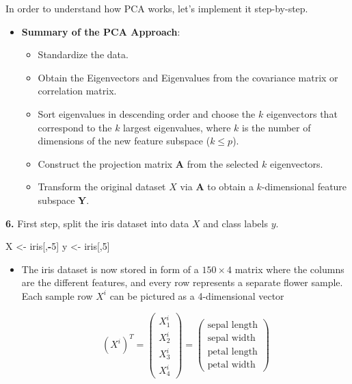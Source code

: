 \documentclass[]{book}
\newenvironment{Shaded}{\begin{snugshade}}{\end{snugshade}}
\newcommand{\DecValTok}[1]{\textcolor[rgb]{0.00,0.00,0.81}{#1}}
\newcommand{\StringTok}[1]{\textcolor[rgb]{0.31,0.60,0.02}{#1}}
\newcommand{\OperatorTok}[1]{\textcolor[rgb]{0.81,0.36,0.00}{\textbf{#1}}}
\newcommand{\NormalTok}[1]{#1}
\providecommand{\tightlist}{%
  \setlength{\itemsep}{0pt}\setlength{\parskip}{0pt}}
\newenvironment{rmdblock}[1]
  {\begin{shaded*}
  \begin{itemize}
  \renewcommand{\labelitemi}{
    \raisebox{-.7\height}[0pt][0pt]{
      {\setkeys{Gin}{width=2em,keepaspectratio}\texttt{[image: img/icons/\#1]}}
    }
  }
  \item
  }
  {
  \end{itemize}
  \end{shaded*}
  }
\newenvironment{rmdinsight}
  {\begin{rmdblock}{insight}}
  {\end{rmdblock}}
\newenvironment{rmdtip}
  {\begin{rmdblock}{tip}}
  {\end{rmdblock}}
\theoremstyle{definition}
\theoremstyle{definition}
\theoremstyle{definition}
\theoremstyle{remark}
\begin{document}
In order to understand how PCA works, let's implement it step-by-step.

\begin{rmdtip}
\textbf{Summary of the PCA Approach}:

\begin{itemize}
\tightlist
\item
  Standardize the data.
\item
  Obtain the Eigenvectors and Eigenvalues from the covariance matrix or
  correlation matrix.
\item
  Sort eigenvalues in descending order and choose the \(k\) eigenvectors
  that correspond to the \(k\) largest eigenvalues, where \(k\) is the
  number of dimensions of the new feature subspace (\(k \le p\)).
\item
  Construct the projection matrix \(\mathbf{A}\) from the selected \(k\)
  eigenvectors.
\item
  Transform the original dataset \(X\) via \(\mathbf{A}\) to obtain a
  \(k\)-dimensional feature subspace \(\mathbf{Y}\).
\end{itemize}
\end{rmdtip}

\textbf{6.} First step, split the iris dataset into data \(X\) and class
labels \(y\).

\begin{Shaded}
\begin{Highlighting}[]
\NormalTok{X <-}\StringTok{ }\NormalTok{iris[,}\OperatorTok{-}\DecValTok{5}\NormalTok{]}
\NormalTok{y <-}\StringTok{ }\NormalTok{iris[,}\DecValTok{5}\NormalTok{]}
\end{Highlighting}
\end{Shaded}

\begin{rmdinsight}
The iris dataset is now stored in form of a \(150 \times 4\) matrix
where the columns are the different features, and every row represents a
separate flower sample. Each sample row \(X^i\) can be pictured as a
4-dimensional vector

\[ (X^i)^T = \begin{pmatrix} X_1^i \\ X_2^i \\ X_3^i \\ X_4^i \end{pmatrix}
= \begin{pmatrix} \text{sepal length} \\ \text{sepal width} \\\text{petal length} \\ \text{petal width} \end{pmatrix}\]
\end{rmdinsight}
\end{document}

